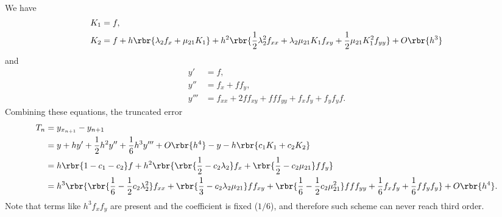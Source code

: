 \documentclass[english, nochinese]{pkupaper}
\begin{document}
\begin{thmquestion}
\ 
\begin{thmproof}
We have
\begin{align}
K_1 &= f, \\
K_2 &= f + h \rbr{ \lambda_2 f_x + \mu_{ 2 1 } K_1 } + h^2 \rbr{ \frac{1}{2} \lambda_2^2 f_{ x x } + \lambda_2 \mu_{ 2 1 } K_1 f_{ x y } + \frac{1}{2} \mu_{ 2 1 } K_1^2 f_{ y y } } + O \rbr{h^3}
\end{align}
and
\begin{align}
y' &= f, \\
y'' &= f_x + f f_y, \\
y''' &= f_{ x x } + 2 f f_{ x y } + f f f_{ y y } + f_x f_y + f_y f_y f.
\end{align}
Combining these equations, the truncated error
\begin{equation}
\begin{split}
T_n &= y_{x_{ n + 1 }} - y_{ n + 1 } \\
&= y + h y' + \frac{1}{2} h^2 y'' + \frac{1}{6} h^3 y''' + O \rbr{h^4} - y - h \rbr{ c_1 K_1 + c_2 K_2 } \\
&= h \rbr{ 1 - c_1 - c_2 } f + h^2 \rbr{ \rbr{ \frac{1}{2} - c_2 \lambda_2 } f_x + \rbr{ \frac{1}{2} - c_2 \mu_{ 2 1 } } f f_y } \\
&= h^3 \rbr{ \rbr{ \frac{1}{6} - \frac{1}{2} c_2 \lambda_2^2 } f_{ x x } + \rbr{ \frac{1}{3} - c_2 \lambda_2 \mu_{ 2 1 } } f f_{ x y } + \rbr{ \frac{1}{6} - \frac{1}{2} c_2 \mu_{ 2 1 }^2 } f f f_{ y y } + \frac{1}{6} f_x f_y + \frac{1}{6} f f_y f_y } + O \rbr{h^4}.
\end{split}
\end{equation}
Note that terms like $ h^3 f_x f_y $ are present and the coefficient is fixed ($ 1 / 6 $), and therefore such scheme can never reach third order.

\sqed
\end{thmproof}
\end{thmquestion}
\end{document}
